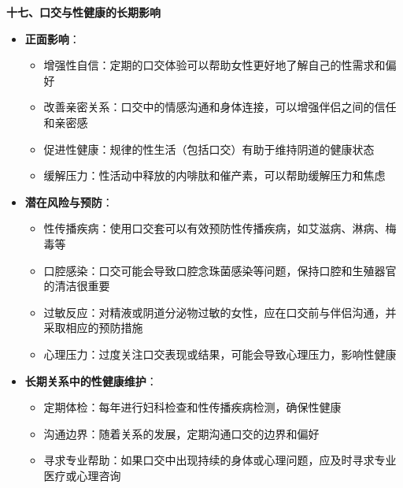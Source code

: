 \documentclass[12pt,UTF8]{ctexbook}
\begin{document}
  \textbf{十七、口交与性健康的长期影响}
  \begin{itemize}
  \item \textbf{正面影响}：
    \begin{itemize}
    \item 增强性自信：定期的口交体验可以帮助女性更好地了解自己的性需求和偏好
    \item 改善亲密关系：口交中的情感沟通和身体连接，可以增强伴侣之间的信任和亲密感
    \item 促进性健康：规律的性生活（包括口交）有助于维持阴道的健康状态
    \item 缓解压力：性活动中释放的内啡肽和催产素，可以帮助缓解压力和焦虑
    \end{itemize}
  \item \textbf{潜在风险与预防}：
    \begin{itemize}
    \item 性传播疾病：使用口交套可以有效预防性传播疾病，如艾滋病、淋病、梅毒等
    \item 口腔感染：口交可能会导致口腔念珠菌感染等问题，保持口腔和生殖器官的清洁很重要
    \item 过敏反应：对精液或阴道分泌物过敏的女性，应在口交前与伴侣沟通，并采取相应的预防措施
    \item 心理压力：过度关注口交表现或结果，可能会导致心理压力，影响性健康
    \end{itemize}
  \item \textbf{长期关系中的性健康维护}：
    \begin{itemize}
    \item 定期体检：每年进行妇科检查和性传播疾病检测，确保性健康
    \item 沟通边界：随着关系的发展，定期沟通口交的边界和偏好
    \item 寻求专业帮助：如果口交中出现持续的身体或心理问题，应及时寻求专业医疗或心理咨询
    \end{itemize}
  \end{itemize}
\end{document}

